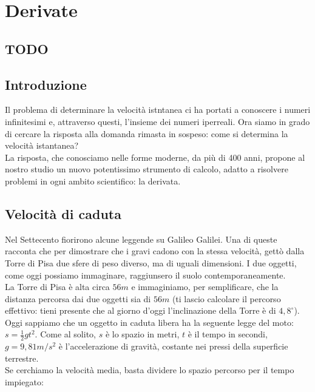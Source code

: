 


\chapter{Derivate}

\section{TODO}

\section{Introduzione}
\label{}

% 

Il problema di determinare la velocità istntanea ci ha portati a conoscere 
i numeri infinitesimi e, attraverso questi, l'insieme dei numeri iperreali.
Ora siamo in grado di cercare la risposta alla domanda rimasta in sospeso: 
come si determina la velocità istantanea?\\
La risposta, che conosciamo nelle forme moderne, da più di 400 anni,
propone al nostro studio un nuovo potentissimo strumento di calcolo, adatto a 
risolvere problemi in ogni ambito scientifico: la derivata.

\section{Velocità di caduta}
\label{04_diffvelcaduta}
Nel Settecento fiorirono alcune leggende su Galileo Galilei. Una di queste 
racconta 
che per dimostrare che i gravi cadono con la stessa velocità, gettò dalla 
Torre
di Pisa due sfere di peso diverso, ma di uguali dimensioni. I due oggetti, 
come
oggi possiamo immaginare, raggiunsero il suolo contemporaneamente.\\
La Torre di Pisa è alta circa $56m$ e immaginiamo, per semplificare, che la 
distanza percorsa dai due oggetti sia di $56m$ (ti lascio calcolare il 
percorso effettivo: tieni presente che al giorno d'oggi l'inclinazione della 
Torre è di $4,8^\circ$).\\
Oggi sappiamo che un oggetto in caduta libera ha la seguente legge del moto:
\(s=\frac{1}{2}gt^2\). Come al solito, $s$ è lo spazio in metri, $t$ è il 
tempo in secondi, $g=9,81 m/s^2$ è l'accelerazione di gravità, costante nei
pressi della superficie terrestre.\\
Se cerchiamo la velocità media, basta dividere lo spazio percorso per il tempo
impiegato:

